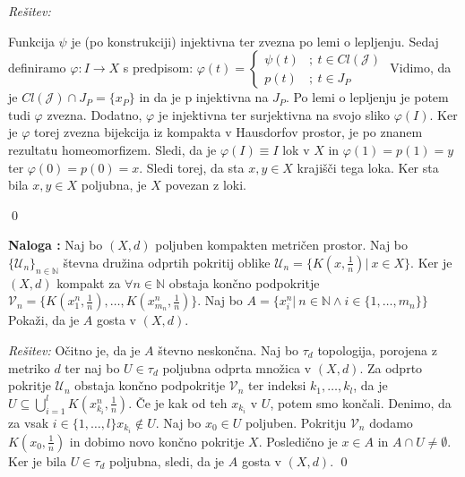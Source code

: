 \documentclass[a4paper, 10pt]{article}
\newcounter{nalogacount}
\newenvironment{naloga}{\begin{flushleft}\stepcounter{nalogacount}\textbf{Naloga \arabic{nalogacount}:}}{\hfill\end{flushleft}}
\newenvironment{Rešitev}{\begin{flushleft}\textit{Rešitev:}}{\hfill\qed\end{flushleft}}
\newcommand{\mth}[1]{\ensuremath{\mathbb{#1}}}
\newcommand{\N}{\mth{N}}
\newcommand{\map}[3]{\ensuremath{{#1}: {#2} \rightarrow {#3}}}
\begin{document}
\begin{Rešitev}
\begin{itemize}
			Funkcija $\psi$ je (po konstrukciji) injektivna ter zvezna po lemi o lepljenju. Sedaj definiramo $\map{\varphi}{I}{X}$ s predpisom: $\varphi(t) = \begin{cases}
			\psi(t) &;~ t\in Cl(\mathcal{J}) \\
			p(t) &;~ t\in J_P
			\end{cases}$ Vidimo, da je $Cl(\mathcal{J})\cap J_P = \{x_P\}$ in da je p injektivna na $J_P$. Po lemi o lepljenju je potem tudi $\varphi$ zvezna. Dodatno, $\varphi$ je injektivna ter surjektivna na svojo sliko $\varphi(I)$. Ker je $\varphi$ torej zvezna bijekcija iz kompakta v Hausdorfov prostor, je po znanem rezultatu homeomorfizem. Sledi, da je $\varphi(I) \equiv I$ lok v $X$ in $\varphi(1) = p(1) = y$ ter $\varphi(0) = p(0) = x$. Sledi torej, da sta $x, y\in X$ krajišči tega loka. Ker sta bila $x, y \in X$ poljubna, je $X$ povezan z loki.
		\end{itemize}
	\end{Rešitev}
	
	\begin{naloga}
		Naj bo $(X, d)$ poljuben kompakten metričen prostor. Naj bo $\{\mathcal{U}_n\}_{n\in\N}$ števna družina odprtih pokritij oblike $\mathcal{U}_n = \{K(x, \frac{1}{n}) |~ x\in X\}$. Ker je $(X, d)$ kompakt za $\forall n \in \N$ obstaja končno podpokritje $\mathcal{V}_n = \{K(x_1^n, \frac{1}{n}), \ldots, K(x_{m_n}^n, \frac{1}{n})\}$. Naj bo $A = \{x_i^n |~ n\in\N \land i\in \{1, \ldots, m_n\}\}$ Pokaži, da je $A$ gosta v $(X, d)$.
	\end{naloga}
	\begin{Rešitev}
		Očitno je, da je $A$ števno neskončna. Naj bo $\tau_d$ topologija, porojena z metriko $d$ ter naj bo $U\in \tau_d$ poljubna odprta množica v $(X, d)$. Za odprto pokritje $\mathcal{U}_n$ obstaja končno podpokritje $\mathcal{V}_n$ ter indeksi $k_1, \ldots, k_l$, da je $U\subseteq \bigcup_{i = 1}^{l}K(x_{k_i}^n, \frac{1}{n})$. Če je kak od teh $x_{k_i}$ v $U$, potem smo končali. Denimo, da za vsak $i\in \{1, \ldots, l\} x_{k_i}\notin U$. Naj bo $x_0\in U$ poljuben. Pokritju $\mathcal{V}_n$ dodamo $K(x_0, \frac{1}{n})$ in dobimo novo končno pokritje $X$. Posledično je $x\in A$ in $A\cap U \neq \emptyset$. Ker je bila $U\in\tau_d$ poljubna, sledi, da je $A$ gosta v $(X, d)$.
	\end{Rešitev}
	
\end{document}

